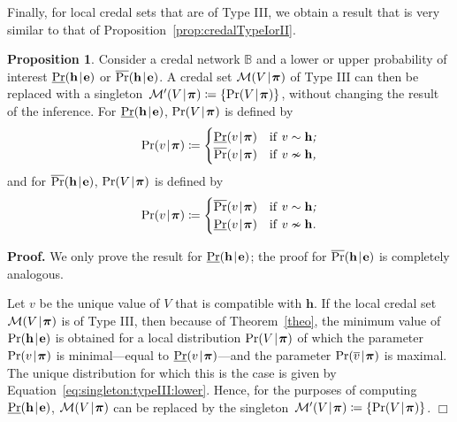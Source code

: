 \documentclass[10pt,a4paper]{paper}
\theoremstyle{definition}
\newtheorem{prop}[theorem]{Proposition}
\newcommand{\vbpi}{\boldsymbol\pi}
\newcommand{\hyp}{\mathbf{h}}
\newcommand{\ev}{\mathbf{e}}
\newcommand{\credal}{\mathcal{M}}
\newcommand{\newmid}{\hspace{0.9pt}\vert\hspace{0.9pt}}
\begin{document}
Finally, for local credal sets that are of Type III, we obtain a result that is very similar to that of Proposition~\ref{prop:credalTypeIorII}.

\begin{prop}\label{prop:credalTypeIII}
Consider a credal network ${\mathbb B}$ and a lower or upper probability of interest $\underline{\Pr}(\hyp\newmid\ev)$ or $\overline{\Pr}(\hyp\newmid\ev)$. A credal set $\credal(V\newmid \vbpi)$ of\/ Type III can then be replaced with a singleton~$\credal'(V\newmid \vbpi)\coloneqq\{\Pr(V\newmid\vbpi)\}$, without changing the result of the inference. For $\underline{\Pr}(\hyp\newmid\ev)$, $\Pr(V\newmid\vbpi)$ is defined by
\begin{equation}\label{eq:singleton:typeIII:lower}
\Pr(v\newmid\vbpi)
\coloneqq
\begin{cases}
\underline{\Pr}(v\newmid\vbpi)
& \text{if\/ $v\sim\hyp$\emph{;}}\\
\overline{\Pr}(v\newmid\vbpi)
& \text{if\/ $v\nsim\hyp$\emph{,}}
\end{cases}
\end{equation}
and for $\overline{\Pr}(\hyp\newmid\ev)$, $\Pr(V\newmid\vbpi)$ is defined by
\begin{equation*}
\Pr(v\newmid\vbpi)
\coloneqq
\begin{cases}
\overline{\Pr}(v\newmid\vbpi)
& \text{if\/ $v\sim\hyp$\emph{;}}\\
\underline{\Pr}(v\newmid\vbpi)
& \text{if\/ $v\nsim\hyp$\emph{.}}
\end{cases}
\end{equation*}
\end{prop}
{\bf Proof.}
We only prove the result for $\underline{\Pr}(\hyp\newmid\ev)$; the proof for $\overline{\Pr}(\hyp\newmid\ev)$ is completely analogous.

Let $v$ be the unique value of $V$ that is compatible with $\hyp$.
If the local credal set $\credal(V\newmid \vbpi)$ is of Type III, then because of Theorem~\ref{theo}, the minimum value of $\Pr(\hyp\newmid\ev)$ is obtained for a local distribution $\Pr(V\newmid\vbpi)$ of which the parameter $\Pr(v\newmid\vbpi)$ is minimal---equal to $\underline{\Pr}(v\newmid\vbpi)$---and the parameter $\Pr(\overline{v}\newmid\vbpi)$ is maximal. The unique distribution for which this is the case is given by Equation~\eqref{eq:singleton:typeIII:lower}. Hence, for the purposes of computing $\underline{\Pr}(\hyp\newmid\ev)$, $\credal(V\newmid \vbpi)$ can be replaced by the singleton~$\credal'(V\newmid \vbpi)\coloneqq\{\Pr(V\newmid\vbpi)\}$.
\hfill$\Box$
\end{document}
